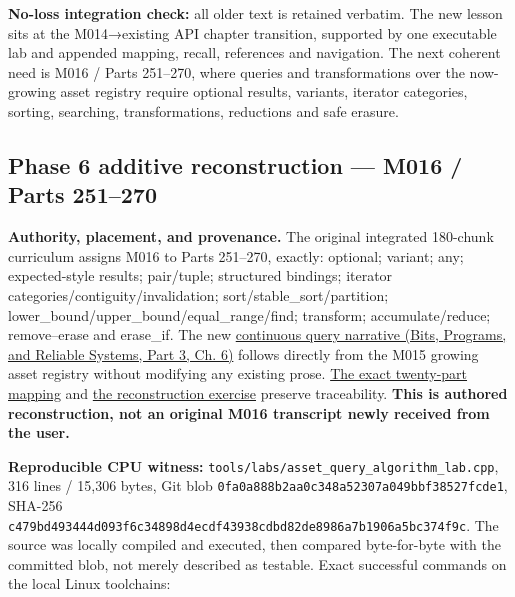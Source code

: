 \textbf{No-loss integration check:} all older text is retained verbatim. The new lesson sits at the M014→existing API chapter transition, supported by one executable lab and appended mapping, recall, references and navigation. The next coherent need is M016 / Parts 251--270, where queries and transformations over the now-growing asset registry require optional results, variants, iterator categories, sorting, searching, transformations, reductions and safe erasure.

\subsection{Phase 6 additive reconstruction --- M016 / Parts 251--270}\label{appendix-a103e7846d21-phase-6-additive-reconstruction-m016-parts-251270}

\hypertarget{appendix-a103e7846d21-phase-6-additive-reconstruction-m016-parts-251270}{}

\textbf{Authority, placement, and provenance.} The original integrated 180-chunk curriculum assigns M016 to Parts 251--270, exactly: optional; variant; any; expected-style results; pair/tuple; structured bindings; iterator categories/contiguity/invalidation; sort/stable\_sort/partition; lower\_bound/upper\_bound/equal\_range/find; transform; accumulate/reduce; remove--erase and erase\_if. The new \href{../01-Bits-Programs-and-Reliable-Systems-P03/main.pdf\#nameddest=01-foundations-i-ch006-from-a-living-asset-registry-to-reliable-queries-and-transformations}{continuous query narrative (Bits, Programs, and Reliable Systems, Part 3, Ch. 6)} follows directly from the M015 growing asset registry without modifying any existing prose. \hyperref[appendix-fd090d982a15-m016-parts-251270-the-asset-registry-becomes-a-query-and-transformation-pipeline]{The exact twenty-part mapping} and \hyperref[appendix-960160274237-query-the-registry-without-confusing-identity-and-a-snapshot-m016-reconstruction]{the reconstruction exercise} preserve traceability. \textbf{This is authored reconstruction, not an original M016 transcript newly received from the user.}

\textbf{Reproducible CPU witness:} \texttt{tools/labs/asset\_query\_algorithm\_lab.cpp}, 316 lines / 15,306 bytes, Git blob \texttt{0fa0a888b2aa0c348a52307a049bbf38527fcde1}, SHA-256 \texttt{c479bd493444d093f6c34898d4ecdf43938cdbd82de8986a7b1906a5bc374f9c}. The source was locally compiled and executed, then compared byte-for-byte with the committed blob, not merely described as testable. Exact successful commands on the local Linux toolchains:

